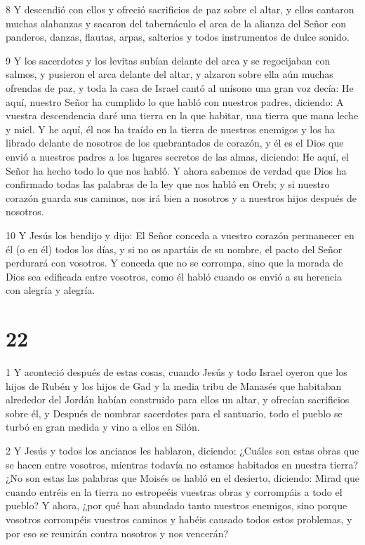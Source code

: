 \par 8 Y descendió con ellos y ofreció sacrificios de paz sobre el altar, y ellos cantaron muchas alabanzas y sacaron del tabernáculo el arca de la alianza del Señor con panderos, danzas, flautas, arpas, salterios y todos instrumentos de dulce sonido.

\par 9 Y los sacerdotes y los levitas subían delante del arca y se regocijaban con salmos, y pusieron el arca delante del altar, y alzaron sobre ella aún muchas ofrendas de paz, y toda la casa de Israel cantó al unísono una gran voz decía: He aquí, nuestro Señor ha cumplido lo que habló con nuestros padres, diciendo: A vuestra descendencia daré una tierra en la que habitar, una tierra que mana leche y miel. Y he aquí, él nos ha traído en la tierra de nuestros enemigos y los ha librado delante de nosotros de los quebrantados de corazón, y él es el Dios que envió a nuestros padres a los lugares secretos de las almas, diciendo: He aquí, el Señor ha hecho todo lo que nos habló. Y ahora sabemos de verdad que Dios ha confirmado todas las palabras de la ley que nos habló en Oreb; y si nuestro corazón guarda sus caminos, nos irá bien a nosotros y a nuestros hijos después de nosotros.

\par 10 Y Jesús los bendijo y dijo: El Señor conceda a vuestro corazón permanecer en él (o en él) todos los días, y si no os apartáis de su nombre, el pacto del Señor perdurará con vosotros. Y conceda que no se corrompa, sino que la morada de Dios sea edificada entre vosotros, como él habló cuando os envió a su herencia con alegría y alegría.



\chapter{22}

\par 1 Y aconteció después de estas cosas, cuando Jesús y todo Israel oyeron que los hijos de Rubén y los hijos de Gad y la media tribu de Manasés que habitaban alrededor del Jordán habían construido para ellos un altar, y ofrecían sacrificios sobre él, y Después de nombrar sacerdotes para el santuario, todo el pueblo se turbó en gran medida y vino a ellos en Silón.

\par 2 Y Jesús y todos los ancianos les hablaron, diciendo: ¿Cuáles son estas obras que se hacen entre vosotros, mientras todavía no estamos habitados en nuestra tierra? ¿No son estas las palabras que Moisés os habló en el desierto, diciendo: Mirad que cuando entréis en la tierra no estropeéis vuestras obras y corrompáis a todo el pueblo? Y ahora, ¿por qué han abundado tanto nuestros enemigos, sino porque vosotros corrompéis vuestros caminos y habéis causado todos estos problemas, y por eso se reunirán contra nosotros y nos vencerán?

